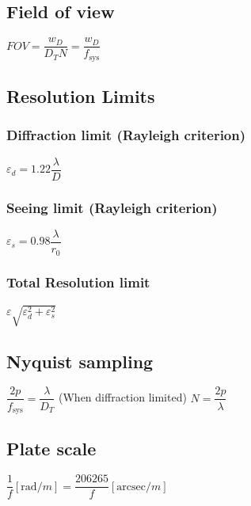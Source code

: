 \subsection{Field of view}		
\begin{itemize}
\itemt \( FOV = \dfrac{w_D}{D_T N} = \dfrac{w_D}{f_\mathrm{sys}} \)
\end{itemize}

\subsection{Resolution Limits}		

\subsubsection{Diffraction limit (Rayleigh criterion)}			
\begin{itemize}
\itemt \( \varepsilon_d = 1.22 \dfrac{\lambda}{D} \)
\end{itemize}			

\subsubsection{Seeing limit (Rayleigh criterion)}			
\begin{itemize}
\itemt \( \varepsilon_s = 0.98 \dfrac{\lambda}{r_0} \)
\end{itemize}

\subsubsection{Total Resolution limit}			
\begin{itemize}
\itemt \( \varepsilon \sqrt{\varepsilon_d^2 + \varepsilon_s^2} \)
\end{itemize}

\subsection{Nyquist sampling}		
\begin{itemize}
\itemt \( \dfrac{2p}{f_\mathrm{sys}} = \dfrac{\lambda}{D_T} \) \tab (When diffraction limited)
\itemt \( N = \dfrac{2p}{\lambda} \)
\end{itemize}			

\subsection{Plate scale}		
\begin{itemize}
\itemt \( \dfrac{1}{f} [\mathrm{rad}/m] = \dfrac{206265}{f} [\mathrm{arcsec}/m] \)
\end{itemize}

